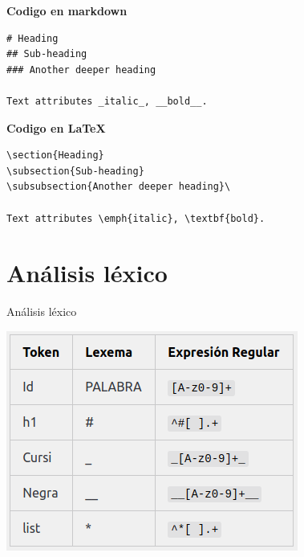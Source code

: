 \documentclass[11pt]{beamer}
\begin{document}
\begin{frame}[fragile]

\textbf{Codigo en markdown}


\begin{verbatim}
# Heading
## Sub-heading
### Another deeper heading
 
Text attributes _italic_, __bold__.

\end{verbatim}


\vspace{1cm}
\textbf{Codigo en \LaTeX}


\begin{verbatim}
\section{Heading}
\subsection{Sub-heading}
\subsubsection{Another deeper heading}\

Text attributes \emph{italic}, \textbf{bold}.

\end{verbatim}

\end{frame}

\section{Análisis léxico}

\begin{frame}{Análisis léxico}

\begin{center}
\includegraphics[scale=0.7]{imagenes/lex.png} 
\end{center}
\end{frame}
\end{document}
